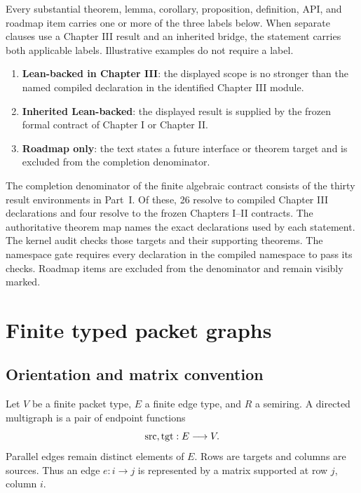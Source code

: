 Every substantial theorem, lemma, corollary, proposition, definition, API,
and roadmap item carries one or more of the three labels below. When separate
clauses use a Chapter III result and an inherited bridge, the statement carries
both applicable labels. Illustrative examples do not require a label.
\begin{enumerate}[label=\textbf{S\arabic*.},leftmargin=3.2em]
\item \textbf{Lean-backed in Chapter III}: the displayed scope is no stronger
than the named compiled declaration in the identified Chapter III module.
\item \textbf{Inherited Lean-backed}: the displayed result is supplied by the
frozen formal contract of Chapter I or Chapter II.
\item \textbf{Roadmap only}: the text states a future interface or theorem
target and is excluded from the completion denominator.
\end{enumerate}

\begin{boundary}
The completion denominator of the finite algebraic contract consists of the
thirty result environments in Part~I. Of these, 26 resolve to compiled
Chapter III declarations and four resolve to the frozen Chapters I--II
contracts. The authoritative theorem map names the exact declarations used
by each statement. The kernel audit checks those targets and their supporting
theorems. The namespace gate requires every declaration in the compiled
 namespace to pass its checks. Roadmap items are
excluded from the denominator and remain visibly marked.
\end{boundary}

\section{Finite typed packet graphs}
\label{sec:edge-operators}

\subsection{Orientation and matrix convention}

Let $V$ be a finite packet type, $E$ a finite edge type, and $R$ a semiring.
A directed multigraph is a pair of endpoint functions
\[
  \operatorname{src},\operatorname{tgt}:E\longrightarrow V.
\]
Parallel edges remain distinct elements of $E$.  Rows are targets and columns
are sources.  Thus an edge $e:i\to j$ is represented by a matrix supported at
row $j$, column $i$.

